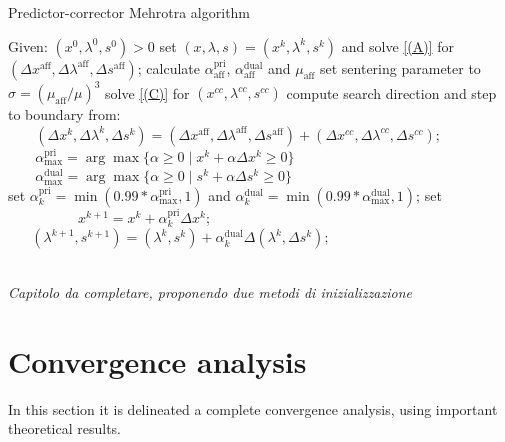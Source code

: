 \documentclass[a4paper,10 pt,titlepage,twoside]{book}
\theoremstyle{plain}
\theoremstyle{definition}
\theoremstyle{remark}
\begin{document}
\begin{algorithm}
	\caption{Predictor-corrector Mehrotra algorithm}
	\begin{algorithmic}[1]		
 		\State Given: $(x^{0}, \lambda^{0}, s^{0}) > 0$
		\State set $(x,\lambda,s)=(x^{k},\lambda^{k},s^{k})$ and solve \ref{(A)} for $(\Delta x^{\text{aff}},\Delta \lambda^{\text{aff}},\Delta s^{\text{aff}})$;
		\State calculate $\alpha_{\text{aff}}^{\text{pri}}$, $\alpha_{\text{aff}}^{\text{dual}}$ and $\mu_{\text{aff}}$
		\State set sentering parameter to $\sigma = (\mu_{\text{aff}}/{\mu})^{3}$
		\State solve \ref{(C)} for $(x^{cc},\lambda^{cc},s^{cc})$
		\State compute search direction and step to boundary from:
		\State $\;\;\;\;\;\;\;(\Delta x^{k},\Delta \lambda^{k},\Delta s^{k})=(\Delta x^{\text{aff}},\Delta \lambda^{\text{aff}},\Delta s^{\text{aff}})+(\Delta x^{cc},\Delta  \lambda^{cc},\Delta s^{cc})$;
		\State $\;\;\;\;\;\;\;\alpha_{\text{max}}^{\text{pri}}=\arg\max\{\alpha\geq0\;|\;x^{k} +\alpha\Delta x^{k}\geq 0\}$
		\State $\;\;\;\;\;\;\;\alpha_{\text{max}}^{\text{dual}}=\arg\max\{\alpha\geq0\;|\;s^{k} +\alpha\Delta s^{k}\geq 0\}$\\
		\State set $\alpha_{k}^{\text{pri}}=\min(0.99\ast\alpha_{\text{max}}^{\text{pri}},1)$ and $\alpha_{k}^{\text{dual}}=\min(0.99\ast\alpha_{\text{max}}^{\text{dual}},1)$;
		\State set
		\State$\;\;\;\;\;\;\;\;\;\;\;\;\;\;\;\;\;\;x^{k+1} = x^{k} + \alpha_{k}^{\text{pri}}\Delta x^{k}$;
		\State$\;\;\;\;\;\;(\lambda^{k+1},s^{k+1}) = (\lambda^{k},s^{k}) + \alpha_{k}^{\text{dual}}\Delta (\lambda^{k},\Delta s^{k})$;		
		\EndFor
	\end{algorithmic}
\end{algorithm}\\
\textit{ Capitolo da completare, proponendo due metodi di inizializzazione}

%
\chapter{Convergence analysis}
In this section it is delineated a complete convergence analysis, using important theoretical results.
\end{document}
